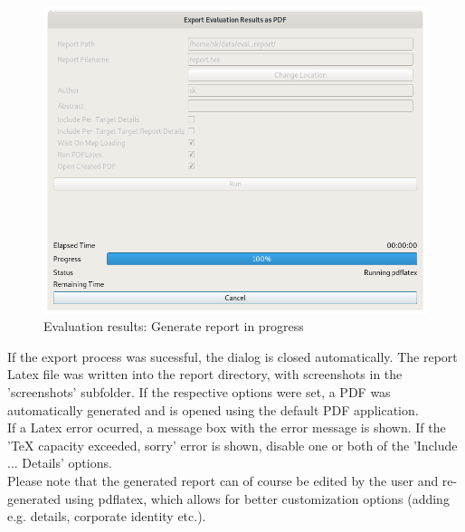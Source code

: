 \begin{figure}[H]
    \includegraphics[width=14cm]{figures/eval_report_status.png}
  \caption{Evaluation results: Generate report in progress}
\end{figure}

If the export process was sucessful, the dialog is closed automatically. The report Latex file was written into the report directory, with screenshots in the 'screenshots' subfolder. If the respective options were set, a PDF was automatically generated and is opened using the default PDF application. \\

If a Latex error ocurred, a message box with the error message is shown. If the 'TeX capacity exceeded, sorry' error is shown, disable one or both of the 'Include ... Details' options.\\

Please note that the generated report can of course be edited by the user and re-generated using pdflatex, which allows for better customization options (adding e.g. details, corporate identity etc.).


